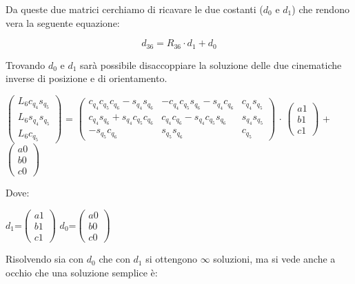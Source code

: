 \documentclass[a4paper,12pt]{article}
\begin{document}
Da queste due matrici cerchiamo di ricavare le due costanti ($d_0$ e $d_1$) che rendono vera la seguente equazione:

$$ d_{36} = R_{36} \cdot d_1 + d_0 $$

Trovando $d_0$ e $d_1$ sarà possibile disaccoppiare la soluzione delle due cinematiche inverse di posizione e di orientamento.





\begin{center}
$\begin{pmatrix}{L_6} {c_{{q_4}}} {s_{{q_5}}}\\
{L_6} {s_{{q_4}}} {s_{{q_5}}}\\
{L_6} {c_{{q_5}}}\end{pmatrix}$
=
$\begin{pmatrix}{c_{{q_4}}} {c_{{q_5}}} {c_{{q_6}}}-{s_{{q_4}}} {s_{{q_6}}} & -{c_{{q_4}}} {c_{{q_5}}} {s_{{q_6}}}-{s_{{q_4}}} {c_{{q_6}}} & {c_{{q_4}}} {s_{{q_5}}}\\
{c_{{q_4}}} {s_{{q_6}}}+{s_{{q_4}}} {c_{{q_5}}} {c_{{q_6}}} & {c_{{q_4}}} {c_{{q_6}}}-{s_{{q_4}}} {c_{{q_5}}} {s_{{q_6}}} & {s_{{q_4}}} {s_{{q_5}}}\\
-{s_{{q_5}}} {c_{{q_6}}} & {s_{{q_5}}} {s_{{q_6}}} & {c_{{q_5}}}\end{pmatrix}$
$\cdot$
$\begin{pmatrix}\mathit{a1}\\
\mathit{b1}\\
\mathit{c1}\end{pmatrix}$
+
$\begin{pmatrix}\mathit{a0}\\
\mathit{b0}\\
\mathit{c0}\end{pmatrix}$
\end{center}

Dove:
\begin{center}
$ d_1 $=$\begin{pmatrix}\mathit{a1}\\
\mathit{b1}\\
\mathit{c1}\end{pmatrix}$
\space
$ d_0 $=$\begin{pmatrix}\mathit{a0}\\
\mathit{b0}\\
\mathit{c0}\end{pmatrix}$
\end{center}


Risolvendo sia con $d_0$ che con $d_1$ si ottengono $\infty$ soluzioni, ma si vede anche a occhio che una soluzione semplice è:
\end{document}
